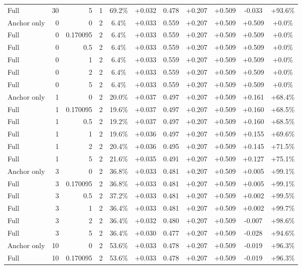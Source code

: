 \begin{table}[htbp]
\begin{tabular}{lrrrccccccc}
Full & 30 & 5 & 1 & 69.2\% & +0.032 & 0.478 & +0.207 & +0.509 & -0.033 & +93.6\% \\
Anchor only & 0 & 0 & 2 & 6.4\% & +0.033 & 0.559 & +0.207 & +0.509 & +0.509 & +0.0\% \\
Full & 0 & 0.170095 & 2 & 6.4\% & +0.033 & 0.559 & +0.207 & +0.509 & +0.509 & +0.0\% \\
Full & 0 & 0.5 & 2 & 6.4\% & +0.033 & 0.559 & +0.207 & +0.509 & +0.509 & +0.0\% \\
Full & 0 & 1 & 2 & 6.4\% & +0.033 & 0.559 & +0.207 & +0.509 & +0.509 & +0.0\% \\
Full & 0 & 2 & 2 & 6.4\% & +0.033 & 0.559 & +0.207 & +0.509 & +0.509 & +0.0\% \\
Full & 0 & 5 & 2 & 6.4\% & +0.033 & 0.559 & +0.207 & +0.509 & +0.509 & +0.0\% \\
Anchor only & 1 & 0 & 2 & 20.0\% & +0.037 & 0.497 & +0.207 & +0.509 & +0.161 & +68.4\% \\
Full & 1 & 0.170095 & 2 & 19.6\% & +0.037 & 0.497 & +0.207 & +0.509 & +0.160 & +68.5\% \\
Full & 1 & 0.5 & 2 & 19.2\% & +0.037 & 0.497 & +0.207 & +0.509 & +0.160 & +68.5\% \\
Full & 1 & 1 & 2 & 19.6\% & +0.036 & 0.497 & +0.207 & +0.509 & +0.155 & +69.6\% \\
Full & 1 & 2 & 2 & 20.4\% & +0.036 & 0.495 & +0.207 & +0.509 & +0.145 & +71.5\% \\
Full & 1 & 5 & 2 & 21.6\% & +0.035 & 0.491 & +0.207 & +0.509 & +0.127 & +75.1\% \\
Anchor only & 3 & 0 & 2 & 36.8\% & +0.033 & 0.481 & +0.207 & +0.509 & +0.005 & +99.1\% \\
Full & 3 & 0.170095 & 2 & 36.8\% & +0.033 & 0.481 & +0.207 & +0.509 & +0.005 & +99.1\% \\
Full & 3 & 0.5 & 2 & 37.2\% & +0.033 & 0.481 & +0.207 & +0.509 & +0.002 & +99.5\% \\
Full & 3 & 1 & 2 & 36.4\% & +0.033 & 0.481 & +0.207 & +0.509 & +0.002 & +99.7\% \\
Full & 3 & 2 & 2 & 36.4\% & +0.032 & 0.480 & +0.207 & +0.509 & -0.007 & +98.6\% \\
Full & 3 & 5 & 2 & 36.4\% & +0.030 & 0.477 & +0.207 & +0.509 & -0.028 & +94.6\% \\
Anchor only & 10 & 0 & 2 & 53.6\% & +0.033 & 0.478 & +0.207 & +0.509 & -0.019 & +96.3\% \\
Full & 10 & 0.170095 & 2 & 53.6\% & +0.033 & 0.478 & +0.207 & +0.509 & -0.019 & +96.3\% \\

\end{tabular}
\end{table}
